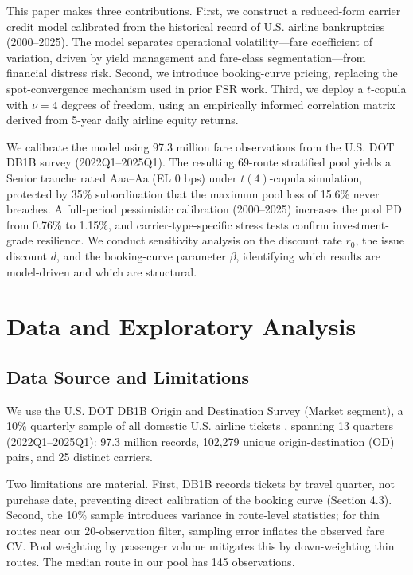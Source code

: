\documentclass[12pt,a4paper]{article}
\begin{document}
This paper makes three contributions. First, we construct a reduced-form carrier credit model calibrated from the historical record of U.S. airline bankruptcies (2000--2025). The model separates operational volatility---fare coefficient of variation, driven by yield management and fare-class segmentation---from financial distress risk. Second, we introduce booking-curve pricing, replacing the spot-convergence mechanism used in prior FSR work. Third, we deploy a $t$-copula with $\nu = 4$ degrees of freedom, using an empirically informed correlation matrix derived from 5-year daily airline equity returns.

We calibrate the model using 97.3 million fare observations from the U.S. DOT DB1B survey (2022Q1--2025Q1). The resulting 69-route stratified pool yields a Senior tranche rated Aaa--Aa (EL 0 bps) under $t(4)$-copula simulation, protected by 35\% subordination that the maximum pool loss of 15.6\% never breaches. A full-period pessimistic calibration (2000--2025) increases the pool PD from 0.76\% to 1.15\%, and carrier-type-specific stress tests confirm investment-grade resilience. We conduct sensitivity analysis on the discount rate $r_0$, the issue discount $d$, and the booking-curve parameter $\beta$, identifying which results are model-driven and which are structural.

\section{Data and Exploratory Analysis}

\subsection{Data Source and Limitations}

We use the U.S. DOT DB1B Origin and Destination Survey (Market segment), a 10\% quarterly sample of all domestic U.S. airline tickets \cite{bts2025}, spanning 13 quarters (2022Q1--2025Q1): 97.3 million records, 102,279 unique origin-destination (OD) pairs, and 25 distinct carriers.

Two limitations are material. First, DB1B records tickets by travel quarter, not purchase date, preventing direct calibration of the booking curve (Section 4.3). Second, the 10\% sample introduces variance in route-level statistics; for thin routes near our 20-observation filter, sampling error inflates the observed fare CV. Pool weighting by passenger volume mitigates this by down-weighting thin routes. The median route in our pool has 145 observations.
\end{document}
